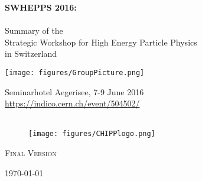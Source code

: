 \documentclass[10pt,a4paper]{article}
\begin{document}
\addtocounter{page}{-1}
\pagestyle{plain}
\begin{center}
{\large {\bf  SWHEPPS 2016:}\\
\ ~\\
Summary of the\\
 Strategic Workshop for High Energy Particle Physics \\
  in Switzerland }\\
\vspace{2cm}

 \texttt{[image: figures/GroupPicture.png]}
 
\vspace{6cm}

Seminarhotel Aegerisee, 7-9 June 2016 \\
\url{https://indico.cern.ch/event/504502/}  ~\\
\  ~\\


\vspace {-0.5cm}
 \begin{figure}[h]
   \centering
   \texttt{[image: figures/CHIPPlogo.png]}
 \end{figure}

\vspace{-0.6cm}
{\textsc {Final Version}}

\today \\
\end{center}
\newpage 

%



%


%


%


%

\end{document}
